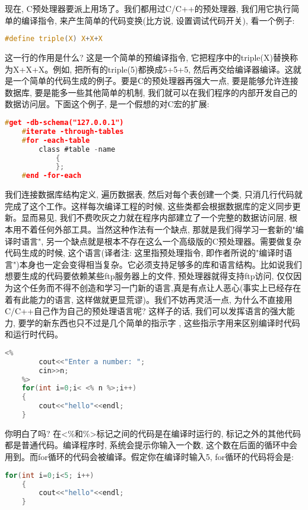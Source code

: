 \documentclass[10pt]{article}
\begin{document}
现在, C预处理器要派上用场了。我们都用过C/C++的预处理器, 我们用它执行简单的编译指令, 来产生简单的代码变换(比方说, 设置调试代码开关), 看一个例子:
\begin{lstlisting}[language=c]
    #define triple(X) X+X+X
\end{lstlisting}

这一行的作用是什么? 这是一个简单的预编译指令, 它把程序中的triple(X)替换称为X+X+X。例如, 把所有的triple(5)都换成5+5+5, 然后再交给编译器编译。这就是一个简单的代码生成的例子。要是C的预处理器再强大一点, 要是能够允许连接数据库, 要是能多一些其他简单的机制, 我们就可以在我们程序的内部开发自己的数据访问层。下面这个例子, 是一个假想的对C宏的扩展:
\begin{lstlisting}[language=c]
    #get -db-schema("127.0.0.1")
    #iterate -through-tables
    #for -each-table
        class #table -name
            {
            };
    #end -for-each
\end{lstlisting}

我们连接数据库结构定义, 遍历数据表, 然后对每个表创建一个类, 只消几行代码就完成了这个工作。这样每次编译工程的时候, 这些类都会根据数据库的定义同步更新。显而易见, 我们不费吹灰之力就在程序内部建立了一个完整的数据访问层, 根本用不着任何外部工具。当然这种作法有一个缺点, 那就是我们得学习一套新的"编译时语言", 另一个缺点就是根本不存在这么一个高级版的C预处理器。需要做复杂代码生成的时候, 这个语言(译者注: 这里指预处理指令, 即作者所说的"编译时语言")本身也一定会变得相当复杂。它必须支持足够多的库和语言结构。比如说我们想要生成的代码要依赖某些ftp服务器上的文件, 预处理器就得支持ftp访问, 仅仅因为这个任务而不得不创造和学习一门新的语言,真是有点让人恶心(事实上已经存在着有此能力的语言, 这样做就更显荒谬)。我们不妨再灵活一点, 为什么不直接用 C/C++自己作为自己的预处理语言呢?  这样子的话, 我们可以发挥语言的强大能力, 要学的新东西也只不过是几个简单的指示字 , 这些指示字用来区别编译时代码和运行时代码。
\begin{lstlisting}[language=c]
    <%
        cout<<"Enter a number: ";
        cin>>n;
    %>
    for(int i=0;i< <% n %>;i++)
    {
        cout<<"hello"<<endl;
    }
\end{lstlisting}

你明白了吗? 在<\%和\%>标记之间的代码是在编译时运行的, 标记之外的其他代码都是普通代码。编译程序时, 系统会提示你输入一个数, 这个数在后面的循环中会用到。而for循环的代码会被编译。假定你在编译时输入5, for循环的代码将会是:
\begin{lstlisting}[language=c++]
    for(int i=0;i<5; i++)
    {
        cout<<"hello"<<endl;
    }
\end{lstlisting}
\end{document}
